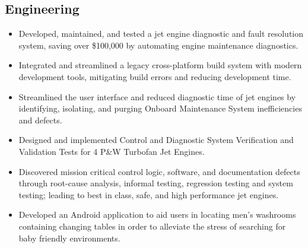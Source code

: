 \documentclass[11pt,a4paper,sans]{moderncv} %
\begin{document}

\subsection{Engineering}

{
	\begin{itemize}
		\item Developed, maintained, and tested a jet engine diagnostic and fault resolution system, saving over \$100,000 by automating engine maintenance diagnostics.
		\item Integrated and streamlined a legacy cross-platform build system with modern development tools, mitigating build errors and reducing development time.
	\end{itemize}
}


{
\begin{itemize}
	\item Streamlined the user interface and reduced diagnostic time of jet engines by identifying, isolating, and purging Onboard Maintenance System inefficiencies and defects.
\end{itemize}
}


{
\begin{itemize}
	\item Designed and implemented Control and Diagnostic System Verification and Validation Tests for 4 P\&W Turbofan Jet Engines. 
	\item Discovered mission critical control logic, software, and documentation defects through root-cause analysis, informal testing, regression testing and system testing; leading to best in class, safe, and high performance jet engines.
\end{itemize}
}


{
\begin{itemize}
	\item Developed an Android application to aid users in locating men's washrooms containing changing tables in order to alleviate the stress of searching for baby friendly environments.
\end{itemize}
}
\end{document}
